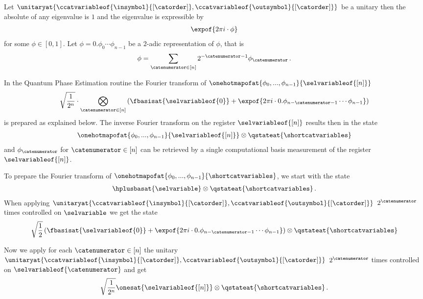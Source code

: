 Let $\unitaryat{\ccatvariableof{\insymbol}{[\catorder]},\ccatvariableof{\outsymbol}{[\catorder]}}$ be a unitary then the absolute of any eigenvalue is $1$ and the eigenvalue is expressible by
\begin{align*}
    \expof{2\pi i \cdot \phi}
\end{align*}
for some $\phi\in[0,1]$.
Let $\phi=0.\phi_{0}\cdots\phi_{n-1}$ be a $2$-adic representation of $\phi$, that is
\begin{align*}
    \phi
    = \sum_{\catenumerator\in[n]} 2^{-\catenumerator-1} \phi_{\catenumerator} \, .
\end{align*}

In the Quantum Phase Estimation routine the Fourier transform of $\onehotmapofat{\phi_0,...,\phi_{n-1}}{\selvariableof{[n]}}$
\begin{align*}
    \sqrt{\frac{1}{2^{n}}} \cdot \bigotimes_{\catenumerator\in[n]} \left(\fbasisat{\selvariableof{0}} + \expof{2\pi i \cdot 0.\phi_{n-\catenumerator-1}\cdots\phi_{n-1}}\right)
\end{align*}
is prepared as explained below.
The inverse Fourier transform on the register $\selvariableof{[n]}$ results then in the state
\begin{align*}
    \onehotmapofat{\phi_0,...,\phi_{n-1}}{\selvariableof{[n]}} \otimes \qstateat{\shortcatvariables}
\end{align*}
and $\phi_{\catenumerator}$ for $\catenumerator\in[n]$ can be retrieved by a single computational basis measurement of the register $\selvariableof{[n]}$.

To prepare the Fourier transform of $\onehotmapofat{\phi_0,...,\phi_{n-1}}{\shortcatvariables}$, we start with the state
\begin{align*}
    \hplusbasat{\selvariable} \otimes \qstateat{\shortcatvariables} \, .
\end{align*}
When applying $\unitaryat{\ccatvariableof{\insymbol}{[\catorder]},\ccatvariableof{\outsymbol}{[\catorder]}}$ $2^{\catenumerator}$ times controlled on $\selvariable$ we get the state
\begin{align*}
    \sqrt{\frac{1}{2}} \left(\fbasisat{\selvariableof{0}} + \expof{2\pi i \cdot 0.\phi_{n-\catenumerator-1}\cdots\phi_{n-1}}\right) \otimes \qstateat{\shortcatvariables}
\end{align*}

Now we apply for each $\catenumerator\in[n]$ the unitary $\unitaryat{\ccatvariableof{\insymbol}{[\catorder]},\ccatvariableof{\outsymbol}{[\catorder]}}$ $2^{\catenumerator}$ times controlled on $\selvariableof{\catenumerator}$ and get
\begin{align*}
    \sqrt{\frac{1}{2^{n}}} \onesat{\selvariableof{[n]}} \otimes \qstateat{\shortcatvariables} \, .
\end{align*}

